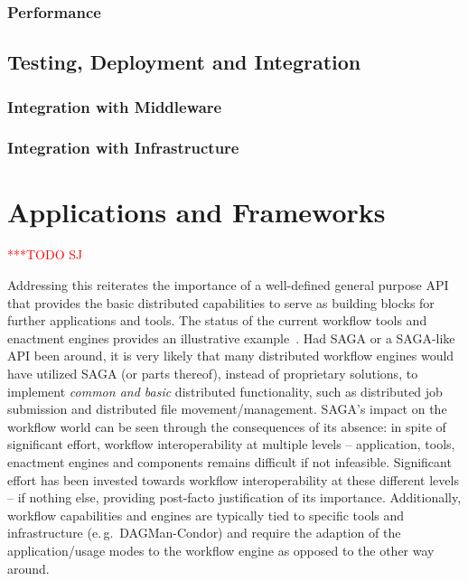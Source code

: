 \documentclass[a4paper,12pt]{article}
\newcommand{\todo}[1]{     {\textcolor{red}  { ***TODO      #1 }}}
\newcommand{\todo}[1]{}
\begin{document}
\subsubsection{Performance}



\subsection{Testing, Deployment and Integration} 



\subsubsection{Integration with Middleware}
\subsubsection{Integration with Infrastructure}



% 
\section{Applications and Frameworks}\todo{SJ}
\label{apps_and_frameworks}


Addressing this reiterates the importance of a well-defined general
purpose API that provides the basic distributed capabilities to serve
as building blocks for further applications and tools. The status of
the current workflow tools and enactment engines provides an
illustrative example~\cite{nsf-workflow,1196459}. Had SAGA or a
SAGA-like API been around, it is very likely that many distributed
workflow engines would have utilized SAGA (or parts thereof), instead
of proprietary solutions, to implement {\it common and basic}
distributed functionality, such as distributed job submission and
distributed file movement/management. SAGA's impact on the workflow
world can be seen through the consequences of its absence: in spite of
significant effort, workflow interoperability at multiple levels --
application, tools, enactment engines and components remains difficult
if not infeasible.  Significant effort has been invested towards
workflow interoperability at these different levels -- if nothing
else, providing post-facto justification of its importance.
Additionally, workflow capabilities and engines are typically tied to
specific tools and infrastructure (e.\,g.\ DAGMan-Condor) and require
the adaption of the application/usage modes to the workflow engine as
opposed to the other way around.
\end{document}
